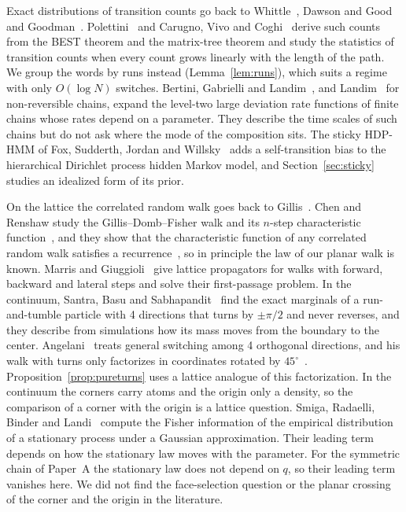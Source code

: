 Exact distributions of transition counts go back to
Whittle~\cite{whittle1955}, Dawson and Good~\cite{dawsongood1957} and
Goodman~\cite{goodman1958}. Polettini~\cite{polettini2015} and Carugno,
Vivo and Coghi~\cite{cvc2022} derive such counts from the BEST theorem and
the matrix-tree theorem and study the statistics of transition counts when
every count grows linearly with the length of the path. We group the words
by runs instead (Lemma~\ref{lem:runs}), which suits a regime with only
$O(\log N)$ switches. Bertini, Gabrielli and Landim~\cite{bgl2024}, and
Landim~\cite{landim2023} for non-reversible chains, expand the level-two
large deviation rate functions of finite chains whose rates depend on a
parameter. They describe the time scales of such chains but do not ask
where the mode of the composition sits. The sticky HDP-HMM of Fox,
Sudderth, Jordan and Willsky~\cite{fox2011} adds a self-transition bias to
the hierarchical Dirichlet process hidden Markov model, and
Section~\ref{sec:sticky} studies an idealized form of its prior.

On the lattice the correlated random walk goes back to
Gillis~\cite{gillis1955}. Chen and Renshaw study the Gillis--Domb--Fisher
walk and its $n$-step characteristic function~\cite{chenrenshaw1992}, and
they show that the characteristic function of any correlated random walk
satisfies a recurrence~\cite{chenrenshaw1994}, so in principle the law of
our planar walk is known. Marris and Giuggioli~\cite{marris2024} give
lattice propagators for walks with forward, backward and lateral steps and
solve their first-passage problem. In the continuum, Santra, Basu and
Sabhapandit~\cite{santra2020} find the exact marginals of a run-and-tumble
particle with 4 directions that turns by $\pm\pi/2$ and never reverses,
and they describe from simulations how its mass moves from the boundary to
the center. Angelani~\cite{angelani2022} treats general switching among 4
orthogonal directions, and his walk with turns only factorizes in
coordinates rotated by $45^\circ$~\cite[Eq.~(36)]{angelani2022}.
Proposition~\ref{prop:pureturns} uses a lattice analogue of this
factorization. In the continuum the corners carry atoms and the origin only
a density, so the comparison of a corner with the origin is a lattice
question. Smiga, Radaelli, Binder and Landi~\cite{smiga2023} compute the
Fisher information of the empirical distribution of a stationary process
under a Gaussian approximation. Their leading term depends on how the
stationary law moves with the parameter. For the symmetric chain of
Paper~A the stationary law does not depend on $q$, so their leading term
vanishes here. We did not find the face-selection question or the planar
crossing of the corner and the origin in the literature.

